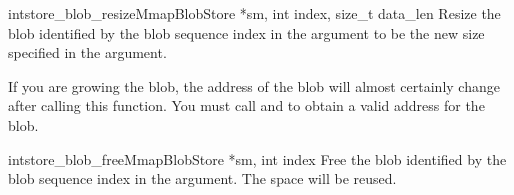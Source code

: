 \begin{cfuncdesc}{int}{store_blob_resize}{MmapBlobStore *sm, int index, size_t data_len}
Resize the blob identified by the blob sequence index in the
 argument to be the new size specified in the
 argument.

If you are growing the blob, the address of the blob will almost
certainly change after calling this function.  You must call
 and 
to obtain a valid address for the blob.
\end{cfuncdesc}

\begin{cfuncdesc}{int}{store_blob_free}{MmapBlobStore *sm, int index}
Free the blob identified by the blob sequence index in the
 argument.  The space will be reused.
\end{cfuncdesc}
